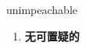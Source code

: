 
\begin{frame}
{\huge unimpeachable}
\begin{center}
\begin{enumerate}\Large
  \item \textbf{无可置疑的}
\end{enumerate}
\end{center}
\end{frame}
